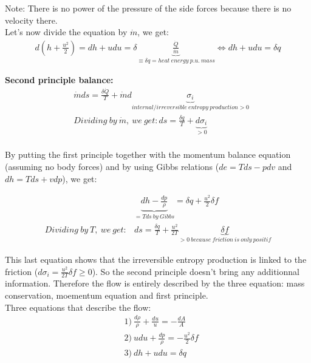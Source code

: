 Note: There is no power of the pressure of the side forces because there is no velocity there.
\\

Let's now divide the equation by $\dot{m}$, we get:
\begin{equation}
\begin{aligned}
d(h+\frac{u^2}{2})=dh+udu=\delta \underbrace{\frac{\dot{Q}}{\dot{m}}}_{\equiv \delta q=heat\ energy\ p.u.\ mass} \Leftrightarrow dh+udu=\delta q 
\end{aligned} 
\end{equation}

\textbf{Second principle balance:}
\\

\begin{equation}
\begin{aligned}
&\dot{m}ds=\frac{\delta \dot{Q}}{T}+\dot{m}d \underbrace{\sigma_i}_{internal/irreversible\ entropy\ production >0 }\\
&Dividing\ by\ \dot{m},\ we\ get: ds=\frac{\delta q}{T}+\underbrace{d\sigma_i}_{>0}
\end{aligned} 
\end{equation}
\\

By putting the first principle together with the momentum balance equation (assuming no body forces) and by using Gibbs relations ($de=Tds-pdv$ and $dh=Tds+vdp$), we get:

\begin{equation}
\begin{aligned}
&\underbrace{dh-\frac{dp}{\rho}}_{=Tds\ by\ Gibbs}=\delta q+\frac{u^2}{2} \delta f  \\
Dividing\ by\ T,\ we\ get: &ds=\frac{\delta q}{T} +\frac{u^2}{2T} \underbrace{\delta f}_{>0\ because\ friction\ is\ only\ positif}
\end{aligned} 
\end{equation}

This last equation shows that the irreversible entropy production is linked to the friction ($d\sigma_i=\frac{u^2}{2T} \delta f \geq 0$). So the second principle doesn't bring any additionnal information. Therefore the flow is entirely described by the three equation: mass conservation, moementum equation and first principle.
\\

Three equations that describe the flow:
 \begin{equation}
\begin{aligned}
&1)\ \frac{d\rho}{\rho}+\frac{du}{u}=-\frac{dA}{A} \\
&2)\ udu+\frac{dp}{\rho}=-\frac{u^2}{2} \delta f\\
&3)\ dh+udu=\delta q
\end{aligned} 
\end{equation}

